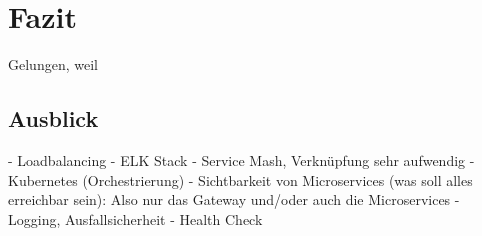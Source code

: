 \section{Fazit}
Gelungen, weil

\subsection{Ausblick}
- Loadbalancing
- ELK Stack
- Service Mash, Verknüpfung sehr aufwendig
- Kubernetes (Orchestrierung)
- Sichtbarkeit von Microservices (was soll alles erreichbar sein): Also nur das Gateway und/oder auch die Microservices
- Logging, Ausfallsicherheit
- Health Check